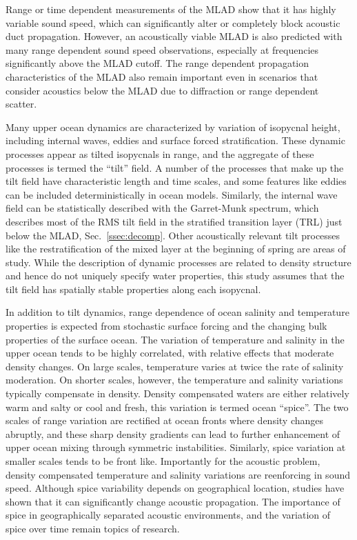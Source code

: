 \documentclass[preprint,NumberedRefs]{JASA}
\begin{document}
Range or time dependent measurements of the MLAD show that it has highly variable sound speed,\citep{cole2010seasonal,rudnick1999compensation,klymak2015} which can significantly alter or completely block acoustic duct propagation.\citep{colosi2020observations,colosi21} However, an acoustically viable MLAD is also predicted with many range dependent sound speed observations, especially at frequencies significantly above the MLAD cutoff. The range dependent propagation characteristics of the MLAD also remain important even in scenarios that consider acoustics below the MLAD due to diffraction or range dependent scatter.\citep{colosi21}

Many upper ocean dynamics are characterized by variation of isopycnal height, including internal waves, eddies and surface forced stratification. These dynamic processes appear as tilted isopycnals in range, and the aggregate of these processes is termed the ``tilt'' field.\cite{dzieciuch2004} A number of the processes that make up the tilt field have characteristic length and time scales, and some features like eddies can be included deterministically in ocean models. Similarly, the internal wave field can be statistically described with the Garret-Munk spectrum,\cite{garrett1972space} which describes most of the RMS tilt field in the stratified transition layer (TRL) just below the MLAD, Sec.~\ref{ssec:decomp}. Other acoustically relevant tilt processes like the restratification of the mixed layer at the beginning of spring are areas of study.\cite{cole2010seasonal} While the description of dynamic processes are related to density structure and hence do not uniquely specify water properties, this study assumes that the tilt field has spatially stable properties along each isopycnal.

In addition to tilt dynamics, range dependence of ocean salinity and temperature properties is expected from stochastic surface forcing and the changing bulk properties of the surface ocean\citep{ferrari2000}. The variation of temperature and salinity in the upper ocean tends to be highly correlated, with relative effects that moderate density changes. On large scales, temperature varies at twice the rate of salinity moderation. On shorter scales, however, the temperature and salinity variations typically compensate in density. Density compensated waters are either relatively warm and salty or cool and fresh, this variation is termed ocean ``spice''\citep{munk1981evolution}. The two scales of range variation are rectified at ocean fronts where density changes abruptly, and these sharp density gradients can lead to further enhancement of upper ocean mixing through symmetric instabilities\citep{dasaro2011}. Similarly, spice variation at smaller scales tends to be front like.\cite{rudnick1999compensation} Importantly for the acoustic problem, density compensated temperature and salinity variations are reenforcing in sound speed. Although spice variability depends on geographical location, studies have shown that it can significantly change acoustic propagation.\citep{colosi12,colosi13,murat2021} The importance of spice in geographically separated acoustic environments, and the variation of spice over time remain topics of research.
\end{document}
